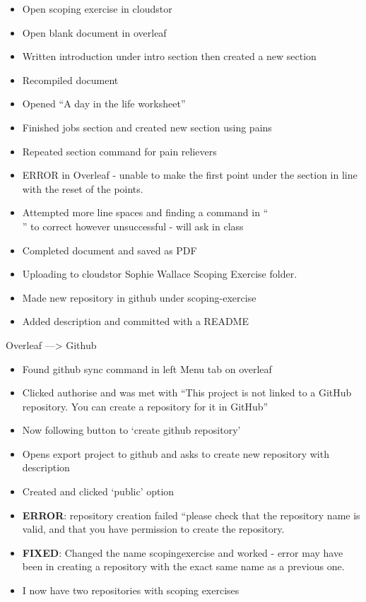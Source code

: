 \documentclass{article}
\begin{document}
\begin{itemize}
\item Open scoping exercise in cloudstor
\item Open blank document in overleaf
\item Written introduction under intro section then created a new section
\item Recompiled document 
\item Opened “A day in the life worksheet”
\item Finished jobs section and created new section using pains
\item Repeated section command for pain relievers
\item ERROR in Overleaf - unable to make the first point under the section in line with the reset of the points.
\item Attempted more line spaces and finding a command in ``\\'' to correct however unsuccessful - will ask in class
\item Completed document and saved as PDF
\item Uploading to cloudstor Sophie Wallace Scoping Exercise folder.
\item Made new repository in github under scoping-exercise 
\item Added description and committed with a README
\end{itemize}


Overleaf —> Github

\begin{itemize}
\item Found github sync command in left Menu tab on overleaf
\item Clicked authorise and was met with “This project is not linked to a GitHub repository. You can create a repository for it in GitHub”
\item Now following button to ‘create github repository’
\item Opens export project to github and asks to create new repository with description
\item Created and clicked ‘public’ option
\item \textbf{ERROR}: repository creation failed “please check that the repository name is valid,  and that you have permission to create the repository.
\item \textbf{FIXED}: Changed the name scopingexercise and worked - error may have been in creating a repository with the exact same name as a previous one.
\item I now have two repositories with scoping exercises
\end{itemize}
\end{document}
